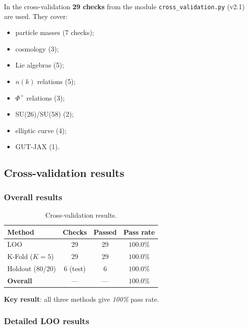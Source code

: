 \documentclass[11pt,a4paper]{article}
\theoremstyle{definition}
\begin{document}
In the cross-validation \textbf{29 checks} from the
module \texttt{cross\_validation.py} (v2.1) are used. They cover:
\begin{itemize}
    \item particle masses (7 checks);
    \item cosmology (3);
    \item Lie algebras (5);
    \item $n(k)$ relations (5);
    \item $\Phi^+$ relations (3);
    \item SU(26)/SU(58) (2);
    \item elliptic curve (4);
    \item GUT-JAX (1).
\end{itemize}

\subsection{Cross-validation results}
\label{subsec:cv-results}

\subsubsection{Overall results}

\begin{table}[ht]
\centering
\caption{Cross-validation results.}
\label{tab:cv-results-main}
\begin{tabular}{lccc}
\toprule
Method & Checks & Passed & Pass rate \\
\midrule
LOO      & 29 & 29 & $100.0\%$ \\
K-Fold ($K=5$) & 29 & 29 & $100.0\%$ \\
Holdout (80/20) & 6 (test) & 6 & $100.0\%$ \\
\midrule
\textbf{Overall} & --- & --- & $\mathbf{100.0\%}$ \\
\bottomrule
\end{tabular}
\end{table}

\medskip\noindent
\textbf{Key result}: all three methods give
\emph{100\%} pass rate.

\subsubsection{Detailed LOO results}
\end{document}
